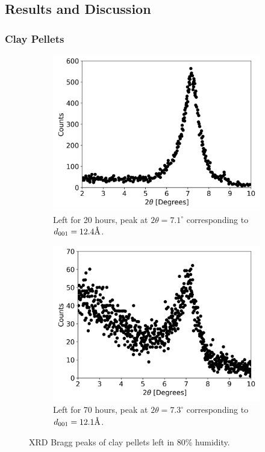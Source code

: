 \subsection{Results and Discussion}
\subsubsection{Clay Pellets}

\begin{figure}
	\centering
	\begin{subfigure}{.5\textwidth}
		\centering
		\includegraphics[scale=0.5]{images/80_1d.png}
		\caption{Left for 20 hours, peak at $2\theta=7.1^\circ$ corresponding to $d_{001}=12.4\text{\normalfont\AA}$.}
		\label{fig:80_1d}
	\end{subfigure}%
	\begin{subfigure}{.5\textwidth}
		\centering
		\includegraphics[scale=0.5]{images/80_3d.png}
		\caption{Left for 70 hours, peak at $2\theta=7.3^\circ$ corresponding to $d_{001}=12.1\text{\normalfont\AA}$.}
		\label{fig:80_3d}
	\end{subfigure}
	\caption{XRD Bragg peaks of clay pellets left in 80\% humidity.}
	\label{fig:80_pellet}
\end{figure}

